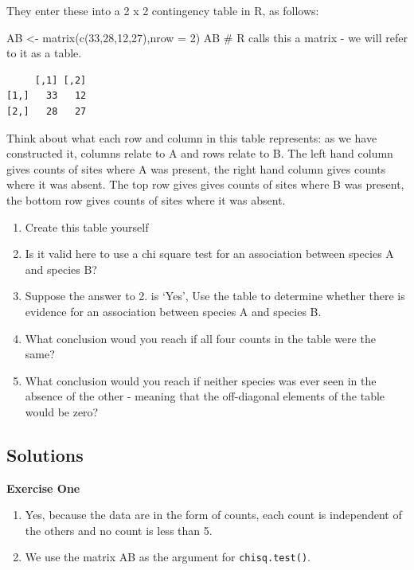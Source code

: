 \documentclass[
  letterpaper,
  DIV=11,
  numbers=noendperiod]{scrreprt}
\newenvironment{Shaded}{\begin{snugshade}}{\end{snugshade}}
\newcommand{\AttributeTok}[1]{\textcolor[rgb]{0.40,0.45,0.13}{#1}}
\newcommand{\CommentTok}[1]{\textcolor[rgb]{0.37,0.37,0.37}{#1}}
\newcommand{\DecValTok}[1]{\textcolor[rgb]{0.68,0.00,0.00}{#1}}
\newcommand{\FunctionTok}[1]{\textcolor[rgb]{0.28,0.35,0.67}{#1}}
\newcommand{\NormalTok}[1]{\textcolor[rgb]{0.00,0.23,0.31}{#1}}
\newcommand{\OtherTok}[1]{\textcolor[rgb]{0.00,0.23,0.31}{#1}}
\providecommand{\tightlist}{%
  \setlength{\itemsep}{0pt}\setlength{\parskip}{0pt}}\usepackage{longtable,booktabs,array}
\begin{document}
They enter these into a 2 x 2 contingency table in R, as follows:

\begin{Shaded}
\begin{Highlighting}[]
\NormalTok{AB }\OtherTok{\textless{}{-}} \FunctionTok{matrix}\NormalTok{(}\FunctionTok{c}\NormalTok{(}\DecValTok{33}\NormalTok{,}\DecValTok{28}\NormalTok{,}\DecValTok{12}\NormalTok{,}\DecValTok{27}\NormalTok{),}\AttributeTok{nrow =} \DecValTok{2}\NormalTok{)}
\NormalTok{AB }\CommentTok{\# R calls this a matrix {-} we will refer to it as a table.}
\end{Highlighting}
\end{Shaded}

\begin{verbatim}
     [,1] [,2]
[1,]   33   12
[2,]   28   27
\end{verbatim}

Think about what each row and column in this table represents: as we
have constructed it, columns relate to A and rows relate to B. The left
hand column gives counts of sites where A was present, the right hand
column gives counts where it was absent. The top row gives gives counts
of sites where B was present, the bottom row gives counts of sites where
it was absent.

\begin{enumerate}
\def\labelenumi{\arabic{enumi}.}
\tightlist
\item
  Create this table yourself
\item
  Is it valid here to use a chi square test for an association between
  species A and species B?
\item
  Suppose the answer to 2. is `Yes', Use the table to determine whether
  there is evidence for an association between species A and species B.
\item
  What conclusion woud you reach if all four counts in the table were
  the same?
\item
  What conclusion would you reach if neither species was ever seen in
  the absence of the other - meaning that the off-diagonal elements of
  the table would be zero?
\end{enumerate}

\subsection{Solutions}\label{solutions-1}

\textbf{Exercise One}

\begin{enumerate}
\def\labelenumi{\arabic{enumi}.}
\setcounter{enumi}{1}
\item
  Yes, because the data are in the form of counts, each count is
  independent of the others and no count is less than 5.
\item
  We use the matrix AB as the argument for \texttt{chisq.test()}.
\end{enumerate}
\end{document}
